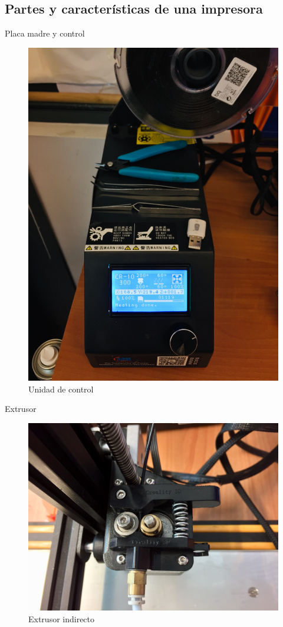 \documentclass{beamer}
\begin{document}
	\subsection{Partes y características de una impresora}
	\begin{frame}{Placa madre y control}
		\begin{figure}
			\includegraphics[height=0.8\textheight]{images/control}
			\caption{Unidad de control}
		\end{figure}
	\end{frame}
	\begin{frame}{Extrusor}
		\begin{figure}
			\includegraphics[height=0.8\textheight]{images/extrusor}
			\caption{Extrusor indirecto}
		\end{figure}
	\end{frame}
\end{document}
